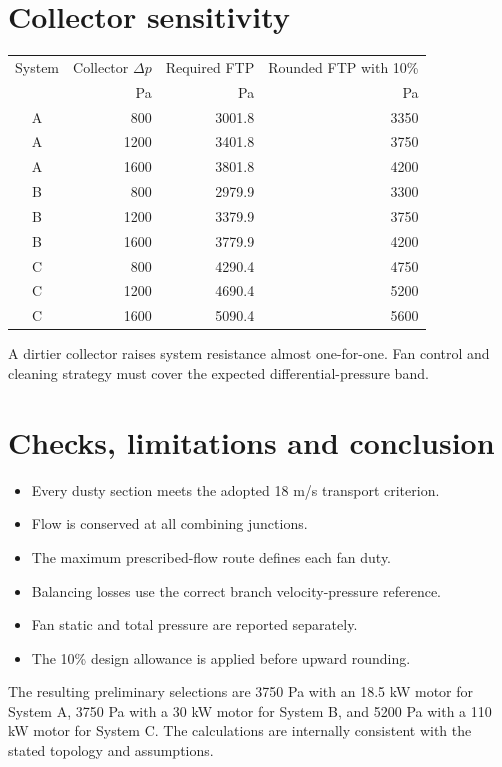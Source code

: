 \documentclass[11pt,a4paper]{article}
\begin{document}
\section{Collector sensitivity}
\begin{center}
\begin{tabular}{crrr}
\toprule
System & Collector $\Delta p$ & Required FTP & Rounded FTP with 10\%\\
 & Pa & Pa & Pa\\
\midrule
A & 800 & 3001.8 & 3350 \\
A & 1200 & 3401.8 & 3750 \\
A & 1600 & 3801.8 & 4200 \\
B & 800 & 2979.9 & 3300 \\
B & 1200 & 3379.9 & 3750 \\
B & 1600 & 3779.9 & 4200 \\
C & 800 & 4290.4 & 4750 \\
C & 1200 & 4690.4 & 5200 \\
C & 1600 & 5090.4 & 5600 \\
\bottomrule
\end{tabular}
\end{center}
A dirtier collector raises system resistance almost one-for-one. Fan control and cleaning strategy must cover the expected differential-pressure band.

\section{Checks, limitations and conclusion}
\begin{itemize}
\item Every dusty section meets the adopted 18 m/s transport criterion.
\item Flow is conserved at all combining junctions.
\item The maximum prescribed-flow route defines each fan duty.
\item Balancing losses use the correct branch velocity-pressure reference.
\item Fan static and total pressure are reported separately.
\item The 10\% design allowance is applied before upward rounding.
\end{itemize}

The resulting preliminary selections are 3750 Pa with an 18.5 kW motor for System A, 3750 Pa with a 30 kW motor for System B, and 5200 Pa with a 110 kW motor for System C. The calculations are internally consistent with the stated topology and assumptions.
\end{document}
